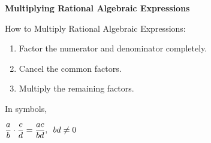 \begin{center}
\textbf{Multiplying Rational Algebraic Expressions
}
\end{center}

\vspce

How to Multiply Rational Algebraic Expressions:
\begin{enumerate}[label = \arabic*. ]
\item Factor the numerator and denominator completely.  
\item Cancel the common factors. 
\item Multiply the remaining factors.   
\end{enumerate}

\vspce

In symbols, 

\begin{center}
$\displaystyle  \frac{a}{b} \cdot  \frac{c}{d} =  \frac{ac}{bd}, \hspace{0.5em} bd \neq 0$ 
\end{center}


